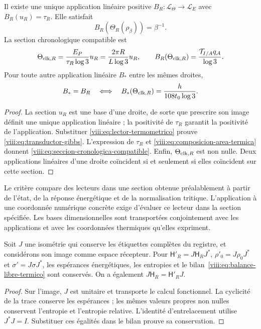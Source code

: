 \begin{theorem}
\label{viii:thm:identificacion-transductor}
Il existe une unique application linéaire positive
\(B_R:\mathcal L_\Theta\to\mathcal L_E\) avec
\(B_R(u_R)=\tau_R\). Elle satisfait
\begin{equation}
 B_R(\Theta_R(\rho_\beta))=\beta^{-1}.
 \label{viii:eq:transductor-gibbs}
\end{equation}
La section chronologique compatible est
\begin{equation}
 \Theta_{{\rm clk},R}
 =\frac{E_P}{\tau_R\log3}u_R
 =\frac{2\pi R}{L\log3}u_R,
 \qquad
 B_R(\Theta_{{\rm clk},R})=
 \frac{\mathcal T_{I/A}q_{\mathcal A}}{\log3}.
 \label{viii:eq:seccion-cronologica-compatible}
\end{equation}
Pour toute autre application linéaire \(B_*\) entre les mêmes droites,
\begin{equation}
 B_*=B_R
 \quad\Longleftrightarrow\quad
 B_*(\Theta_{{\rm clk},R})=\frac{h}{108t_0\log3}.
 \label{viii:eq:criterio-una-seccion}
\end{equation}
\end{theorem}
\begin{proof}
La section \(u_R\) est une base d'une droite, de sorte que prescrire
son image définit une unique application linéaire ; la positivité de \(\tau_R\)
garantit la positivité de l'application. Substituer
\eqref{viii:eq:lector-termometrico} prouve
\eqref{viii:eq:transductor-gibbs}. L'expression de \(\tau_R\) et
\eqref{viii:eq:composicion-area-termica} donnent
\eqref{viii:eq:seccion-cronologica-compatible}. Enfin,
\(\Theta_{{\rm clk},R}\) est non nulle. Deux applications linéaires d'une
droite coïncident si et seulement si elles coïncident sur cette section.
\end{proof}

Le critère compare des lecteurs dans une section obtenue préalablement à partir de l'état, de la réponse énergétique et de la normalisation tritique. L'application à une coordonnée numérique concrète exige d'évaluer ce lecteur dans la section spécifiée. Les bases dimensionnelles sont transportées conjointement avec les applications et avec les coordonnées thermiques qu'elles expriment.

\begin{proposition}
\label{viii:prop:transporte-termico-memoria}
Soit \(J\) une isométrie qui conserve les étiquettes complètes du
registre, et considérons son image comme espace récepteur. Pour
\(\mathsf H'_R=J\mathsf H_RJ^*\), \(\rho'_0=J\rho_0J^*\)
et \(\sigma'=J\sigma J^*\), les espérances énergétiques,
les entropies et le bilan~\eqref{viii:eq:balance-libre-termico} sont conservés.
On a également \(J\mathsf H_R=\mathsf H'_RJ\).
\end{proposition}
\begin{proof}
Sur l'image, \(J\) est unitaire et transporte le calcul fonctionnel.
La cyclicité de la trace conserve les espérances ; les mêmes valeurs propres
non nulles conservent l'entropie et l'entropie relative. L'identité
d'entrelacement utilise \(J^*J=I\). Substituer ces égalités dans le bilan
prouve sa conservation.
\end{proof}

